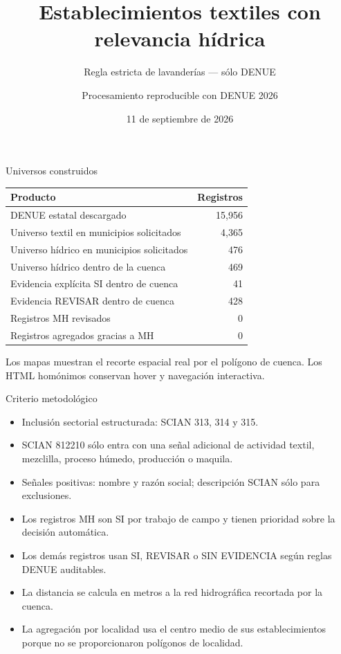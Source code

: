 \documentclass[aspectratio=169]{beamer}
\title{Establecimientos textiles con relevancia hídrica}
\subtitle{Regla estricta de lavanderías — sólo DENUE}
\author{Procesamiento reproducible con DENUE 2026}
\date{11 de septiembre de 2026}
\begin{document}
\begin{frame}\titlepage\end{frame}
\begin{frame}{Universos construidos}
\centering
\begin{tabular}{lr}\toprule
Producto & Registros\\\midrule
DENUE estatal descargado & 15,956\\
Universo textil en municipios solicitados & 4,365\\
Universo hídrico en municipios solicitados & 476\\
Universo hídrico dentro de la cuenca & 469\\
Evidencia explícita SI dentro de cuenca & 41\\
Evidencia REVISAR dentro de cuenca & 428\\
Registros MH revisados & 0\\
Registros agregados gracias a MH & 0\\
\bottomrule\end{tabular}
\vfill
Los mapas muestran el recorte espacial real por el polígono de cuenca. Los HTML homónimos conservan hover y navegación interactiva.
\end{frame}
\begin{frame}{Criterio metodológico}
\begin{itemize}
\item Inclusión sectorial estructurada: SCIAN 313, 314 y 315.
\item SCIAN 812210 sólo entra con una señal adicional de actividad textil, mezclilla, proceso húmedo, producción o maquila.
\item Señales positivas: nombre y razón social; descripción SCIAN sólo para exclusiones.
\item Los registros MH son SI por trabajo de campo y tienen prioridad sobre la decisión automática.
\item Los demás registros usan SI, REVISAR o SIN EVIDENCIA según reglas DENUE auditables.
\item La distancia se calcula en metros a la red hidrográfica recortada por la cuenca.
\item La agregación por localidad usa el centro medio de sus establecimientos porque no se proporcionaron polígonos de localidad.
\end{itemize}
\end{frame}
\end{document}
